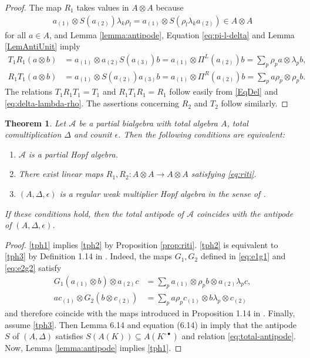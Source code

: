 \documentclass[10pt]{article}
\newtheorem{Theorem}{Theorem}[section]
\theoremstyle{definition}
\numberwithin{equation}{section}
\begin{document}
\begin{proof}
  The map $R_{1}$ takes values in $A\otimes A$ because
  \begin{align*}
  a_{(1)} \otimes
  S(a_{(2)})\lambda_{k}\rho_{l} =  a_{(1)} \otimes S(\rho_{l}\lambda_{k}a_{(2)}) \in A
  \otimes A
  \end{align*}
  for all $a\in A$, and Lemma
  \ref{lemma:antipode},  Equation \eqref{eq:pi-l-delta} and Lemma \ref{LemAntiUnit} imply
  \begin{align*}
    T_{1}R_{1}(a \otimes b)&= a_{(1)} \otimes a_{(2)}S(a_{(3)})b =
    a_{(1)} \otimes \Pi^{L}(a_{(2)})b =
    \sum_{p} \rho_{p}a \otimes \lambda_{p}b, \\
    R_{1}T_{1}(a \otimes b) &= a_{(1)} \otimes S(a_{(2)})a_{(3)}b =
    a_{(1)} \otimes \Pi^{R}(a_{(2)})b = \sum_{p} a\rho_{p}\otimes
    \rho_{p}b.
  \end{align*}
 The relations $T_{1}R_{1}T_{1}=T_{1}$ and
$R_{1}T_{1}R_{1}=R_{1}$ follow easily from  \eqref{EqDel} and
\eqref{eq:delta-lambda-rho}. The assertions concerning $R_{2}$ and
$T_{2}$ follow similarly.
\end{proof}
\begin{Theorem}  \label{theorem:partial-hopf-algebra}
  Let $\mathscr{A}$ be a partial bialgebra with total algebra $A$,
  total comultiplication $\Delta$ and counit $\epsilon$. Then the
  following conditions are equivalent:
  \begin{enumerate}[label={(\arabic*)}]
  \item\label{tph1} $\mathscr{A}$ is a partial Hopf algebra.
  \item\label{tph2} There exist linear maps $R_{1},R_{2} \colon A\otimes A\to
    A\otimes A$ satisfying  \eqref{eq:riti}.
  \item\label{tph3} $(A,\Delta,\epsilon)$  is a regular weak multiplier Hopf algebra in the sense of \cite{VDW1}.
  \end{enumerate}
  If these conditions hold, then the total  antipode of $\mathscr{A}$ coincides with the antipode of $(A,\Delta,\epsilon)$.
\end{Theorem}
\begin{proof}
\ref{tph1} implies \ref{tph2} by Proposition \ref{prop:riti}. \ref{tph2} is equivalent to \ref{tph3} by Definition
1.14 in \cite{VDW1}. Indeed, the maps $G_{1},G_{2}$ defined in \eqref{eq:e1g1} and \eqref{eq:e2g2} satisfy
\begin{align*}
  G_{1}(a_{(1)} \otimes b) \otimes a_{(2)}c &= \sum_{p} a_{(1)} \otimes \rho_{p}b
  \otimes a_{(2)}\lambda_{p}c, \\
  ac_{(1)} \otimes G_{2}(b\otimes c_{(2)}) &=\sum_{p} a\rho_{p}c_{(1)} \otimes b\lambda_{p} \otimes c_{(2)}
\end{align*}
and therefore coincide with the maps introduced in Proposition 1.14 in
\cite{VDW1}.  Finally, assume \ref{tph3}. Then
 Lemma 6.14 and equation (6.14) in \cite{Boh1} imply that the antipode
$S$ of $(A,\Delta)$ satisfies $S(A(K))\subseteq A(K^{\circ\bullet})$ and relation \eqref{eq:total-antipode}.  Now, Lemma \ref{lemma:antipode} implies \ref{tph1}.
\end{proof}
\end{document}
